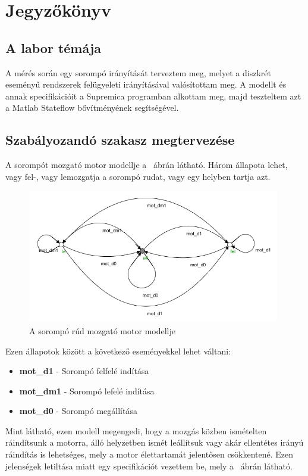 \chapter{Jegyzőkönyv}





\section{A labor témája}
A mérés során egy sorompó irányítását terveztem meg, melyet a diszkrét eseményű rendszerek felügyeleti irányításával valósítottam meg. A modellt és annak specifikációit a Supremica programban alkottam meg, majd teszteltem azt a Matlab Stateflow bővítményének segítségével.


\section{Szabályozandó szakasz megtervezése}
A sorompót mozgató motor modellje a ~ábrán látható. Három állapota lehet, vagy fel-, vagy lemozgatja a sorompó rudat, vagy egy helyben tartja azt. 

\begin{figure}
	\centering
	\includegraphics[width=110mm,keepaspectratio]{figures/2m03/b_motor.png}
	\caption{A sorompó rúd mozgató motor modellje}
	\label{fig:Motor}
\end{figure}
Ezen állapotok között a következő eseményekkel lehet váltani:
\begin{itemize}
	\item \textbf{mot\_d1} - Sorompó felfelé indítása
	\item \textbf{mot\_dm1} - Sorompó lefelé indítása
	\item \textbf{mot\_d0} - Sorompó megállítása
\end{itemize}
Mint látható, ezen modell megengedi, hogy a mozgás közben ismételten ráindítsunk a motorra, álló helyzetben ismét leállítsuk vagy akár ellentétes irányú ráindítás is lehetséges, mely a motor élettartamát jelentősen csökkentené. Ezen jelenségek letiltása miatt egy specifikációt vezettem be, mely a ~ábrán látható.

